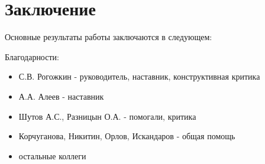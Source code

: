 \chapter*{Заключение}                       %


Основные результаты работы заключаются в следующем:

\clearpage
Благодарности:
\begin{itemize}
	\item С.В. Рогожкин - руководитель, наставник, конструктивная критика
	\item А.А. Алеев - наставник
	\item Шутов А.С., Разницын О.А. - помогали, критика
	\item Корчуганова, Никитин, Орлов, Искандаров - общая помощь
	\item остальные коллеги
\end{itemize}



